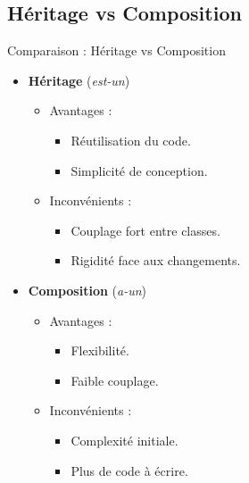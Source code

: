 \documentclass[aspectratio=169]{beamer}
\begin{document}
\subsection{Héritage vs Composition}

\begin{frame}{Comparaison : Héritage vs Composition}
    \begin{itemize}
        \item \textbf{Héritage} (\textit{est-un})
              \begin{itemize}
                  \item Avantages :
                        \begin{itemize}
                            \item Réutilisation du code.
                            \item Simplicité de conception.
                        \end{itemize}
                  \item Inconvénients :
                        \begin{itemize}
                            \item Couplage fort entre classes.
                            \item Rigidité face aux changements.
                        \end{itemize}
              \end{itemize}
        \item \textbf{Composition} (\textit{a-un})
              \begin{itemize}
                  \item Avantages :
                        \begin{itemize}
                            \item Flexibilité.
                            \item Faible couplage.
                        \end{itemize}
                  \item Inconvénients :
                        \begin{itemize}
                            \item Complexité initiale.
                            \item Plus de code à écrire.
                        \end{itemize}
              \end{itemize}
    \end{itemize}
\end{frame}
\end{document}
